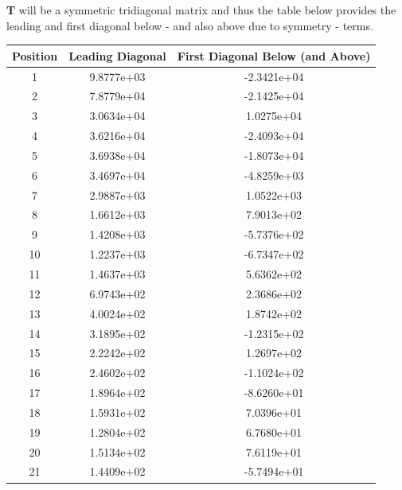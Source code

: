 \documentclass{article}
\begin{document}
\begin{enumerate}
\begin{enumerate}
			\textbf{T} will be a symmetric tridiagonal matrix and thus the table below provides the leading and first diagonal below - and also above due to symmetry - terms.
			 
\begin{table}[h]              
\centering                 
\begin{tabular}{|c|c|c|}
\hline
Position & Leading Diagonal & First Diagonal Below (and Above) \\     
\hline                     
1 & 9.8777e+03 & -2.3421e+04 \\
\hline                     
2 & 7.8779e+04 & -2.1425e+04 \\
\hline                     
3 & 3.0634e+04 & 1.0275e+04 \\ 
\hline                     
4 & 3.6216e+04 & -2.4093e+04 \\
\hline                     
5 & 3.6938e+04 & -1.8073e+04 \\
\hline                     
6 & 3.4697e+04 & -4.8259e+03 \\
\hline                     
7 & 2.9887e+03 & 1.0522e+03 \\ 
\hline                     
8 & 1.6612e+03 & 7.9013e+02 \\ 
\hline                     
9 & 1.4208e+03 & -5.7376e+02 \\
\hline                     
10 & 1.2237e+03 & -6.7347e+02 \\
\hline                     
11 & 1.4637e+03 & 5.6362e+02 \\ 
\hline                     
12 & 6.9743e+02 & 2.3686e+02 \\ 
\hline                     
13 & 4.0024e+02 & 1.8742e+02 \\ 
\hline                     
14 & 3.1895e+02 & -1.2315e+02 \\
\hline                     
15 & 2.2242e+02 & 1.2697e+02 \\ 
\hline                     
16 & 2.4602e+02 & -1.1024e+02 \\
\hline                     
17 & 1.8964e+02 & -8.6260e+01 \\
\hline                     
18 & 1.5931e+02 & 7.0396e+01 \\ 
\hline                     
19 & 1.2804e+02 & 6.7680e+01 \\ 
\hline                     
20 & 1.5134e+02 & 7.6119e+01 \\ 
\hline                     
21 & 1.4409e+02 & -5.7494e+01 \\

\end{tabular}
\end{table}
\end{enumerate}
\end{enumerate}
\end{document}
